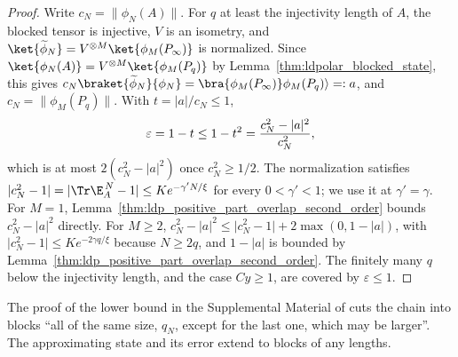 \begin{proof}
    \leanok
    Write $c_N=\lVert\phi_N(A)\rVert$. For $q$ at least the injectivity length
    of $A$, the blocked tensor is injective, $V$ is an isometry, and
    $\ket{\widetilde\phi_N}=V^{\otimes M}\ket{\phi_M(P_\infty)}$ is
    normalized. Since $\ket{\phi_N(A)}=V^{\otimes M}\ket{\phi_M(P_q)}$ by
    Lemma~\ref{thm:ldpolar_blocked_state}, this gives
    $c_N\braket{\widetilde\phi_N}{\phi_N}
        =\bra{\phi_M(P_\infty)}\phi_M(P_q)\rangle=:a$, and
    $c_N=\lVert\phi_M(P_q)\rVert$. With $t=\lvert a\rvert/c_N\le1$,
    \begin{align}
        \varepsilon=1-t\le1-t^2=\frac{c_N^2-\lvert a\rvert^2}{c_N^2},
        \notag
    \end{align}
    which is at most $2(c_N^2-\lvert a\rvert^2)$ once $c_N^2\ge1/2$. The
    normalization satisfies $\lvert c_N^2-1\rvert=\lvert\Tr\E_A^{\,N}-1\rvert
        \le Ke^{-\gamma' N/\xi}$ for every $0<\gamma'<1$; we use it at $\gamma'=\gamma$.
    For $M=1$, Lemma~\ref{thm:ldp_positive_part_overlap_second_order} bounds
    $c_N^2-\lvert a\rvert^2$ directly. For $M\ge2$,
    $c_N^2-\lvert a\rvert^2\le\lvert c_N^2-1\rvert+2\max(0,1-\lvert a\rvert)$,
    with $\lvert c_N^2-1\rvert\le Ke^{-2\gamma q/\xi}$ because $N\ge2q$, and
    $1-\lvert a\rvert$ is bounded by
    Lemma~\ref{thm:ldp_positive_part_overlap_second_order}. The finitely many
    $q$ below the injectivity length, and the case $Cy\ge1$, are covered by
    $\varepsilon\le1$.
\end{proof}



The proof of the lower bound in the Supplemental Material of
\cite{Malz2024Preparation} cuts the chain into blocks ``all of the same size,
$q_N$, except for the last one, which may be larger''. The approximating state
and its error extend to blocks of any lengths.

